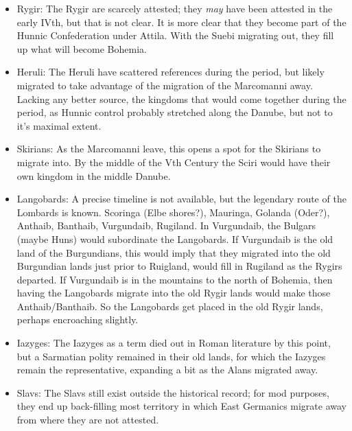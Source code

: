 \documentclass{article}
\begin{document}
\begin{itemize}
		\item Rygir:\newline
		The Rygir are scarcely attested; they \textit{may} have been attested in the early IVth, but that is not clear.
		It is more clear that they become part of the Hunnic Confederation under Attila.
		With the Suebi migrating out, they fill up what will become Bohemia.
		
		\item Heruli:\newline
		The Heruli have scattered references during the period, but likely migrated to take advantage of the migration of the Marcomanni away.
		Lacking any better source, the kingdoms that would come together during the period, as Hunnic control probably stretched along the Danube, but not to it's maximal extent.
		
		\item Skirians:\newline
		As the Marcomanni leave, this opens a spot for the Skirians to migrate into.
		By the middle of the Vth Century the Sciri would have their own kingdom in the middle Danube.
		
		\item Langobards:\newline
		A precise timeline is not available, but the legendary route of the Lombards is known.
		Scoringa (Elbe shores?), Mauringa, Golanda (Oder?), Anthaib, Banthaib, Vurgundaib, Rugiland.
		In Vurgundaib, the Bulgars (maybe Huns) would subordinate the Langobards.
		If Vurgundaib is the old land of the Burgundians, this would imply that they migrated into the old Burgundian lands just prior to Ruigland, would fill in Rugiland as the Rygirs departed.
		If Vurgundaib is in the mountains to the north of Bohemia, then having the Langobards migrate into the old Rygir lands would make those Anthaib/Banthaib.
		So the Langobards get placed in the old Rygir lands, perhaps encroaching slightly.
		
		\item Iazyges:\newline
		The Iazyges as a term died out in Roman literature by this point, but a Sarmatian polity remained in their old lands, for which the Iazyges remain the representative, expanding a bit as the Alans migrated away.
		
		\item Slavs:\newline
		The Slavs still exist outside the historical record; for mod purposes, they end up back-filling most territory in which East Germanics migrate away from where they are not attested.
	\end{itemize}
	
\end{document}
